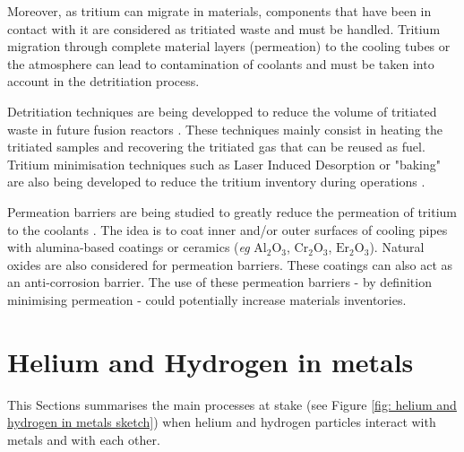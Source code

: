 Moreover, as tritium can migrate in materials, components that have been in contact with it are considered as tritiated waste and must be handled.
Tritium migration through complete material layers (permeation) to the cooling tubes  or the atmosphere can lead to contamination of coolants and must be taken into account in the detritiation process.

Detritiation techniques are being developped to reduce the volume of tritiated waste in future fusion reactors .
These techniques mainly consist in heating the tritiated samples and recovering the tritiated gas  that can be reused as fuel.
Tritium minimisation techniques such as Laser Induced Desorption or "baking" are also being developed to reduce the tritium inventory during operations .

Permeation barriers are being studied to greatly reduce the permeation of tritium to the coolants .
The idea is to coat inner and/or outer surfaces of cooling pipes with alumina-based coatings or ceramics (\textit{eg} $\mathrm{Al_2 O_3}$, $\mathrm{Cr_2 O_3}$, $\mathrm{Er_2 O_3}$).
Natural oxides are also considered for permeation barriers.
These coatings can also act as an anti-corrosion barrier.
The use of these permeation barriers - by definition minimising permeation - could potentially increase materials inventories.

\section{Helium and Hydrogen in metals}

This Sections summarises the main processes at stake (see Figure \ref{fig: helium and hydrogen in metals sketch}) when helium and hydrogen particles interact with metals and with each other.

